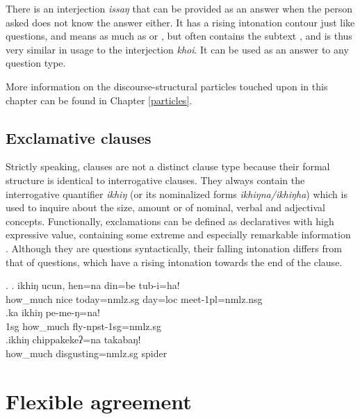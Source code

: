 There is an interjection \emph{issaŋ} that can be provided as an answer when the person asked does not know the answer either. It has a rising intonation contour just like questions, and means as much as  or , but often contains the subtext , and is thus very similar in usage to the  interjection \emph{khoi}. It can be used as an answer to any question type.

More information on the discourse-structural particles touched upon in this chapter can be found in Chapter \ref{particles}.

\subsection{Exclamative clauses}

Strictly speaking,  clauses are not a distinct clause type because their formal structure is identical to interrogative clauses. They always contain the interrogative quantifier \emph{ikhiŋ} (or its nominalized forms \emph{ikhiŋna/ikhiŋha}) which is used to inquire about the size, amount or  of nominal, verbal and adjectival concepts. Functionally, exclamations can be defined as declaratives with high expressive value, containing some extreme and especially remarkable information \citep[316]{Koenig2007_Speech}. Although they are questions syntactically, their falling intonation differs from that of questions, which have a rising intonation towards the end of the clause.

\ex. \ag. ikhiŋ   ucun, hen=na din=be    tub-i=ha!\\
how\_much nice today{\sc =nmlz.sg} day{\sc =loc} meet{\sc -1pl=nmlz.nsg}\\
 
\bg.ka  ikhiŋ   pe-me-ŋ=na!\\
{\sc 1sg} how\_much fly{\sc -npst-1sg=nmlz.sg}\\
 
\bg.ikhiŋ chippakekeʔ=na takabaŋǃ\\
how\_much disgusting{\sc =nmlz.sg} spider\\

\section{Flexible agreement}\label{flex-agr}

